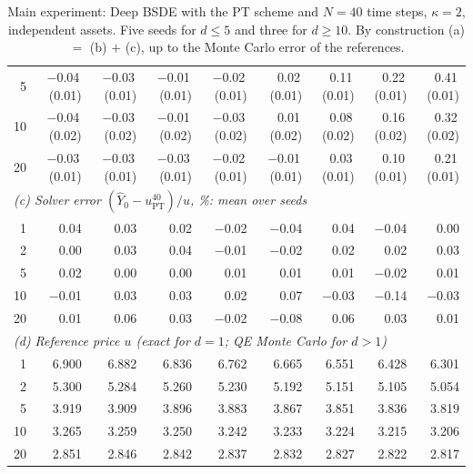 \begin{table}[t]
\begin{tabular}{rrrrrrrrr}
5 & $-$0.04\,{\scriptsize(0.01)} & $-$0.03\,{\scriptsize(0.01)} & $-$0.01\,{\scriptsize(0.01)} & $-$0.02\,{\scriptsize(0.01)} & 0.02\,{\scriptsize(0.01)} & 0.11\,{\scriptsize(0.01)} & 0.22\,{\scriptsize(0.01)} & 0.41\,{\scriptsize(0.01)}\\
10 & $-$0.04\,{\scriptsize(0.02)} & $-$0.03\,{\scriptsize(0.02)} & $-$0.01\,{\scriptsize(0.02)} & $-$0.03\,{\scriptsize(0.02)} & 0.01\,{\scriptsize(0.02)} & 0.08\,{\scriptsize(0.02)} & 0.16\,{\scriptsize(0.02)} & 0.32\,{\scriptsize(0.02)}\\
20 & $-$0.03\,{\scriptsize(0.01)} & $-$0.03\,{\scriptsize(0.01)} & $-$0.03\,{\scriptsize(0.01)} & $-$0.02\,{\scriptsize(0.01)} & $-$0.01\,{\scriptsize(0.01)} & 0.03\,{\scriptsize(0.01)} & 0.10\,{\scriptsize(0.01)} & 0.21\,{\scriptsize(0.01)}\\
\midrule
\multicolumn{9}{l}{\emph{(c) Solver error $(\hat Y_0-u^{40}_{\mathrm{PT}})/u$, \%: mean over seeds}}\\
1 & 0.04 & 0.03 & 0.02 & $-$0.02 & $-$0.04 & 0.04 & $-$0.04 & 0.00\\
2 & 0.00 & 0.03 & 0.04 & $-$0.01 & $-$0.02 & 0.02 & 0.02 & 0.03\\
5 & 0.02 & 0.00 & 0.00 & 0.01 & 0.01 & 0.01 & $-$0.02 & 0.01\\
10 & $-$0.01 & 0.03 & 0.03 & 0.02 & 0.07 & $-$0.03 & $-$0.14 & $-$0.03\\
20 & 0.01 & 0.06 & 0.03 & $-$0.02 & $-$0.08 & 0.06 & 0.03 & 0.01\\
\midrule
\multicolumn{9}{l}{\emph{(d) Reference price $u$ (exact for $d=1$; QE Monte Carlo for $d>1$)}}\\
1 & 6.900 & 6.882 & 6.836 & 6.762 & 6.665 & 6.551 & 6.428 & 6.301\\
2 & 5.300 & 5.284 & 5.260 & 5.230 & 5.192 & 5.151 & 5.105 & 5.054\\
5 & 3.919 & 3.909 & 3.896 & 3.883 & 3.867 & 3.851 & 3.836 & 3.819\\
10 & 3.265 & 3.259 & 3.250 & 3.242 & 3.233 & 3.224 & 3.215 & 3.206\\
20 & 2.851 & 2.846 & 2.842 & 2.837 & 2.832 & 2.827 & 2.822 & 2.817\\
\bottomrule
\end{tabular}
\caption{Main experiment: Deep BSDE with the PT scheme and $N=40$ time steps, $\kappa=2$, independent assets. Five seeds for $d\le5$ and three for $d\ge10$. By construction (a) $=$ (b) $+$ (c), up to the Monte Carlo error of the references.}
\label{tab:main}
\end{table}
